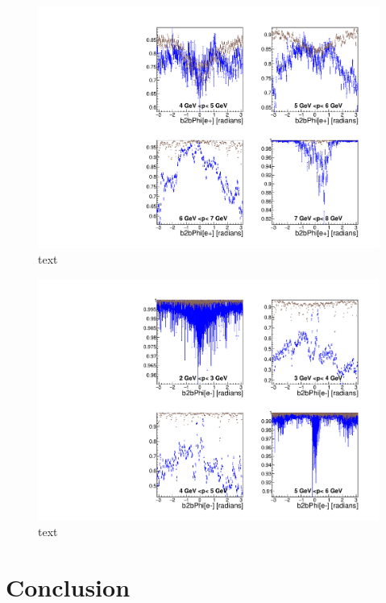 \documentclass[a4paper,11pt,twosided,final,german,openbib,pdftex,listof=totoc,bibliography=totoc]{scrbook}
\begin{document}
\begin{figure}[!htbp]
	\centering
	\includegraphics[width=\textwidth]{Plots/comp/cMPhiemFC_Data.pdf}
	\caption[text]{text}
	\label{plt:compPhiemFC}
\end{figure}


\begin{figure}[!htbp]
	\centering
	\includegraphics[width=\textwidth]{Plots/comp/cMPhiepEC_Data.pdf}
	\caption[text]{text}
	\label{plt:compPhiemEC}
\end{figure}



\chapter{Conclusion}
\end{document}
